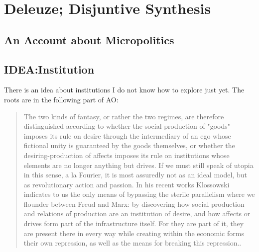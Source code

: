 \chapter{Deleuze; Disjuntive Synthesis}\label{chap:Deleuze} %

\section{An Account about Micropolitics}

\section{IDEA:Institution}
\begin{commentenv}
	There is an idea about institutions I do not know how to explore just yet.
	The roots are in the following part of AO:


\end{commentenv}

\begin{quote}
	The two kinds of fantasy, or rather the two regimes, are therefore distinguished according to whether the social production of "goods" imposes its rule on desire through the intermediary of an ego whose fictional unity is guaranteed by the goods themselves, or whether the desiring-production of affects imposes its rule on institutions whose elements are no longer anything but drives. If we must still speak of utopia in this sense, a la Fourier, it is most assuredly not as an ideal model, but as revolutionary action and passion. In his recent works Klossowski indicates to us the only means of bypassing the sterile parallelism where we flounder between Freud and Marx: by discovering how social production and relations of production are an institution of desire, and how affects or drives form part of the infrastructure itself. For they are part of it, they are present there in every way while creating within the economic forms their own repression, as well as the means for breaking this repression.\cite[63]{deleuze1983}.
\end{quote}



